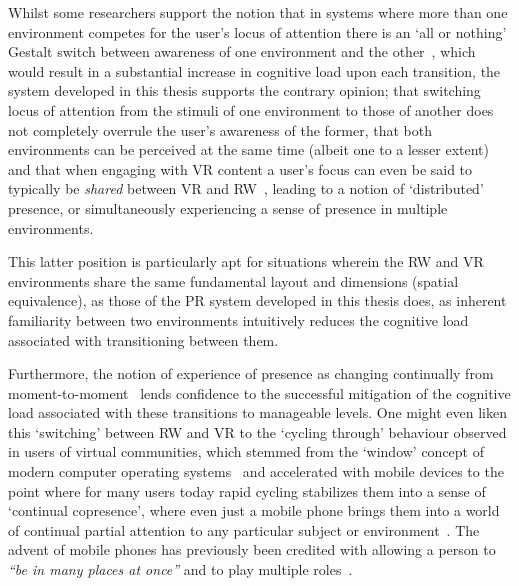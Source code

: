 

Whilst some researchers support the notion that in systems where more than one environment competes for the user's locus of attention there is an `all or nothing' Gestalt switch between awareness of one environment and the other~\cite{Slater2002}, which would result in a substantial increase in cognitive load upon each transition, the system developed in this thesis supports the contrary opinion; that switching locus of attention from the stimuli of one environment to those of another does not completely overrule the user's awareness of the former, that both environments can be perceived at the same time (albeit one to a lesser extent)~\cite{Ijsselsteijn2001} and that when engaging with VR content a user's focus can even be said to typically be \textit{shared} between VR and RW~\cite{Waterworth2001}, leading to a notion of `distributed' presence, or simultaneously experiencing a sense of presence in multiple environments.

This latter position is particularly apt for situations wherein the RW and VR environments share the same fundamental layout and dimensions (spatial equivalence), as those of the PR system developed in this thesis does, as inherent familiarity between two environments intuitively reduces the cognitive load associated with transitioning between them.

Furthermore, the notion of experience of presence as changing continually from moment-to-moment~\cite{Heeter2003, Ijsselsteijn1998} lends confidence to the successful mitigation of the cognitive load associated with these transitions to manageable levels. One might even liken this `switching' between RW and VR to the `cycling through' behaviour observed in users of virtual communities, which stemmed from the `window' concept of modern computer operating systems~\cite{Turkle2004} and accelerated with mobile devices to the point where for many users today rapid cycling stabilizes them into a sense of `continual copresence', where even just a mobile phone brings them into a world of continual partial attention to any particular subject or environment~\cite{Turkle2011}. The advent of mobile phones has previously been credited with allowing a person to \textit{``be in many places at once''} and to play multiple roles~\cite{Terashima2001}. %

